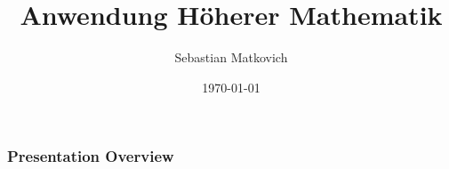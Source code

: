 \documentclass[
	11pt, %
]{beamer}
\title[Anw. h\"ohere Mathe]{Anwendung Höherer Mathematik} %
\author[]{Sebastian Matkovich} %
\institute[FHCW]{FH Campus Wien \\ \smallskip \textit{sebastianmatkovich@gmail.com}} %
\date[\today]{ \today} %
\begin{document}

\begin{frame}
	\titlepage %
\end{frame}



\begin{frame}
	\frametitle{Presentation Overview} %
	
	\tableofcontents %
\end{frame}

\end{document}
